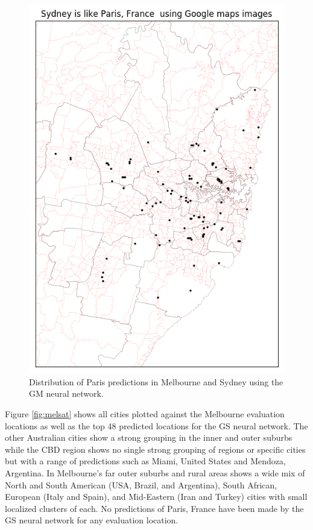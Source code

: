 \documentclass[sageh,times]{sagej}
\begin{document}
\begin{figure}[!htbp]
\includegraphics[scale=0.40]{Images/Sydney_Paris,France-GM.png} 
\caption{Distribution of Paris predictions in Melbourne and Sydney using the GM neural network.}    
 \label{fig:gm_melsyd_paris}  
\end{figure} 

Figure \ref{fig:melsat} shows all cities plotted against the Melbourne evaluation locations as well as the top 48 predicted locations for the GS neural network. The other Australian cities show a strong grouping in the inner and outer suburbs while the CBD region shows no single strong grouping of regions or specific cities but with a range of predictions such as Miami, United States and Mendoza, Argentina. In Melbourne's far outer suburbs and rural areas shows a wide mix of North and South American (USA, Brazil, and Argentina), South African, European (Italy and Spain), and Mid-Eastern (Iran and Turkey) cities with small localized clusters of each. No predictions of Paris, France have been made by the GS neural network for any evaluation location.
\end{document}
